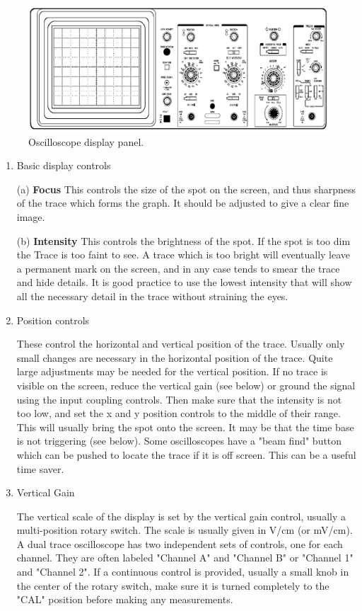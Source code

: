 \begin{figure}
\includegraphics{AC-Measurements-osc-controls.png}
\caption{Oscilloscope display panel.}
\label{fig:acOscilloscope}
\end{figure}

\begin{enumerate}
\item Basic display controls

(a) {\bf Focus} This controls the size of the spot on the screen, and thus sharpness of the trace which forms the graph. It should be adjusted to give a clear fine image.

(b) {\bf Intensity} This controls the brightness of the spot. If the spot is too dim the Trace is too faint to see. A trace which is too bright will eventually leave a permanent mark on the screen, and in any case tends to smear the trace and hide details. It is good practice to use the lowest intensity that will show all the necessary detail in the trace without straining the eyes.

\item Position controls

These control the horizontal and vertical position of the trace. Usually only small changes are necessary in the horizontal position of the trace. Quite large adjustments may be needed for the vertical position. If no trace is visible on the screen, reduce the vertical gain (see below) or ground the signal using the input coupling controls. Then make sure that the intensity is not too low, and set the x and y position controls to the middle of their range. This will usually bring the spot onto the screen. It may be that the time base is not triggering (see below). Some oscilloscopes have a "beam find" button which can be pushed to locate the trace if it is off screen. This can be a useful time saver.

\item Vertical Gain

The vertical scale of the display is set by the vertical gain control, usually a multi-position rotary switch. The scale is usually given in V/cm (or mV/cm). A dual trace oscilloscope has two independent sets of controls, one for each channel. They are often labeled "Channel A" and "Channel B" or "Channel 1" and "Channel 2". If a continuous control is provided, usually a small knob in the center of the rotary switch, make sure it is turned completely to the "CAL" position before making any measurements.


\end{enumerate}
